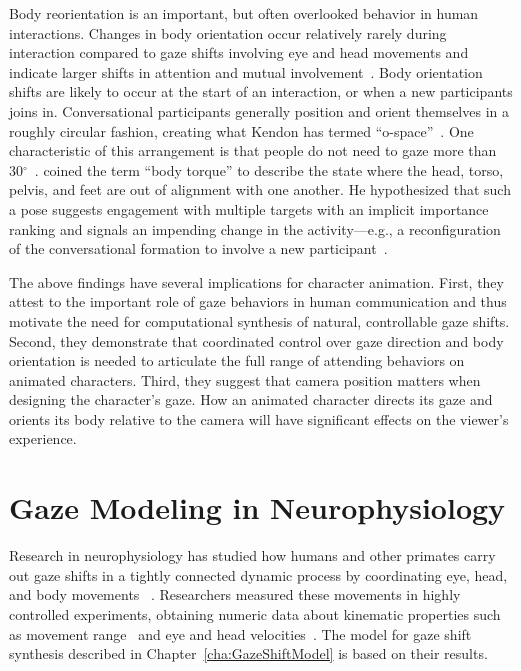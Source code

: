 Body reorientation is an important, but often overlooked behavior in human interactions. Changes in body orientation occur relatively rarely during interaction compared to gaze shifts involving eye and head movements and indicate larger shifts in attention and mutual involvement~\citep{kendon1990conducting,schegloff1998bodytorque}.
Body orientation shifts are likely to occur at the start of an interaction, or when a new participants joins in. Conversational participants generally position and orient themselves in a roughly circular fashion, creating what Kendon has termed ``o-space''~\citep{kendon1990conducting}. One characteristic of this arrangement is that people do not need to gaze more than 30$^{\circ}$~\citep{kendon1990conducting}. \citet{schegloff1998bodytorque} coined the term ``body torque'' to describe the state where the head, torso, pelvis, and feet are out of alignment with one another. He hypothesized that such a pose suggests engagement with multiple targets with an implicit importance ranking and signals an impending change in the activity---e.g., a reconfiguration of the conversational formation to involve a new participant~\citep{kendon1990conducting}.

The above findings have several implications for character animation. First, they attest to the important role of gaze behaviors in human communication and thus motivate the need for computational synthesis of natural, controllable gaze shifts. Second, they demonstrate that coordinated control over gaze direction and body orientation is needed to articulate the full range of attending behaviors on animated characters. Third, they suggest that camera position matters when designing the character's gaze. How an animated character directs its gaze and orients its body relative to the camera will have significant effects on the viewer's experience.

\section{Gaze Modeling in Neurophysiology}

Research in neurophysiology has studied how humans and other primates carry out gaze shifts in a tightly connected dynamic process by coordinating eye, head, and body movements  ~\citep{zangemeister1982types,andredeshays1988eyehead1,barnes1979vor,freedman2000coordination,uemura1980eyehead,mccluskey2007monkeys}. Researchers measured these movements in highly controlled experiments, obtaining numeric data about kinematic properties such as movement range~\citep{guitton1987gaze} and eye and head velocities~\citep{guitton1987gaze,freedman2000coordination,barnes1979vor,uemura1980eyehead}. The model for gaze shift synthesis described in Chapter~\ref{cha:GazeShiftModel} is based on their results.

